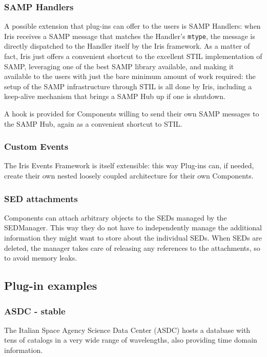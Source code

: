 \documentclass[preprint,12pt,3p]{elsarticle}
\begin{document}
\subsubsection{SAMP Handlers}
A possible extension that plug-ins can offer to the users is SAMP Handlers: when Iris receives a SAMP message that matches the Handler's \verb|mtype|, the message is directly dispatched to the Handler itself by the Iris framework. As a matter of fact, Iris just offers a convenient shortcut to the excellent STIL implementation of SAMP, leveraging one of the best SAMP library available, and making it available to the users with just the bare minimum amount of work required: the setup of the SAMP infrastructure through STIL is all done by Iris, including a keep-alive mechanism that brings a SAMP Hub up if one is shutdown.

A hook is provided for Components willing to send their own SAMP messages to the SAMP Hub, again as a convenient shortcut to STIL.

\subsubsection{Custom Events}
The Iris Events Framework is itself extensible: this way Plug-ins can, if needed, create their own nested loosely coupled architecture for their own Components.

\subsubsection{SED attachments}
Components can attach arbitrary objects to the SEDs managed by the SEDManager. This way they do not have to independently manage the additional information they might want to store about the individual SEDs. When SEDs are deleted, the manager takes care of releasing any references to the attachments, so to avoid memory leaks.



\subsection{Plug-in examples}
\subsubsection{ASDC - stable}
The Italian Space Agency Science Data Center (ASDC) hosts a database with tens of catalogs in a very wide range of wavelengths, also providing time domain information.
\end{document}
